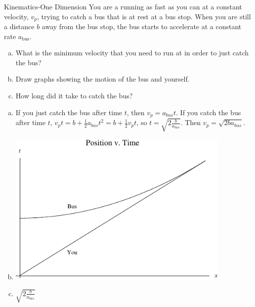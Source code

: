 \documentclass{esg8012pset}
\begin{document}
\begin{question}[Problem 2]
\begin{problem}{Kinematics-One Dimension}
  You are a running as fast as you can at a constant velocity, $v_p$, trying to catch a bus that is at rest
  at a bus stop. When you are still a distance $b$ away from the bus stop, the bus starts to accelerate
  at a constant rate $a_\text{bus}$.
  \begin{enumerate}[a)]
    \item What is the minimum velocity that you need to run at in order to just catch the bus?
    \item Draw graphs showing the motion of the bus and yourself.
    \item How long did it take to catch the bus?
  \end{enumerate}
\end{problem}
\begin{solution}
  \begin{enumerate}[a)]
    \item If you just catch the bus after time $t$, then $v_p = a_{bus}t$.  If you catch the bus after time $t$, $v_p t = b + \frac{1}{2}a_{bus}t^2 = b + \frac{1}{2}v_p t$, so $t = \sqrt{2\frac{b}{a_{bus}}}$.  Then $v_p = \sqrt{2 b a_{bus}}$.
    \item \includegraphics[width=0.85\textwidth]{ps01_Plot_4}
    \item $\sqrt{2\frac{b}{a_{bus}}}$
  \end{enumerate}
\end{solution}


\end{question}
\end{document}
